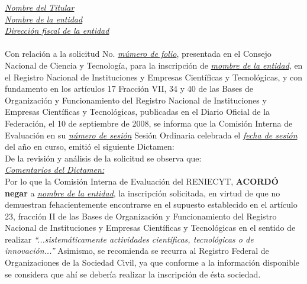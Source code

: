 \noindent \underline{{\it Nombre del Titular}}\\
\noindent \underline{{\it Nombre de la entidad}}\\
\noindent \underline{{\it Dirección fiscal de la entidad}}\\ \\



\noindent Con relación a la solicitud No. \underline{{\it múmero de folio}}, presentada en el Consejo Nacional de Ciencia y Tecnología, para la inscripción de \underline{{\it mombre de la entidad}}, en el Registro Nacional de Instituciones y Empresas Científicas y Tecnológicas, y con fundamento en los artículos 17 Fracción VII, 34 y 40 de las Bases de Organización y Funcionamiento del Registro Nacional de Instituciones y Empresas Científicas y Tecnológicas, publicadas en el Diario Oficial de la Federación, el 10 de septiembre de 2008, se informa que la Comisión Interna de Evaluación en su \underline{{\it número de sesión}} Sesión Ordinaria celebrada el \underline{{\it fecha de sesión}} del año en curso, emitió el siguiente Dictamen: \\

\noindent De la revisión y análisis de la solicitud se observa que:\\

\underline{{\it Comentarios del Dictamen:}}\\


\noindent Por lo que la Comisión Interna de Evaluación del RENIECYT, {\bf ACORDÓ negar} a \underline{{\it nombre de la entidad}}, la inscripción solicitada, en virtud de que no demuestran fehacientemente encontrarse en el supuesto establecido en el artículo 23, fracción II de las Bases de Organización y Funcionamiento del Registro Nacional de Instituciones y Empresas Científicas y Tecnológicas en el sentido de realizar {\it ``...sistemáticamente actividades científicas, tecnológicas o de innovación...''} Asimismo, se recomienda se recurra al Registro Federal de Organizaciones de la Sociedad Civil, ya que conforme a la información disponible se considera que ahí se debería realizar la inscripción de ésta sociedad.\\

